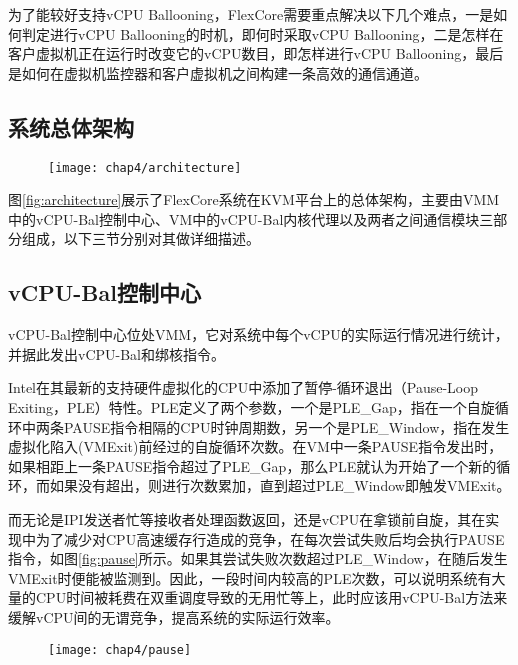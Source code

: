 为了能较好支持vCPU Ballooning，FlexCore需要重点解决以下几个难点，一是如何判定进行vCPU Ballooning的时机，即何时采取vCPU Ballooning，二是怎样在客户虚拟机正在运行时改变它的vCPU数目，即怎样进行vCPU Ballooning，最后是如何在虚拟机监控器和客户虚拟机之间构建一条高效的通信通道。

\subsection{系统总体架构}

\begin{figure}[!htbp]
  \centering
  \texttt{[image: chap4/architecture]}
\end{figure}

图\ref{fig:architecture}展示了FlexCore系统在KVM平台上的总体架构，主要由VMM中的vCPU-Bal控制中心、VM中的vCPU-Bal内核代理以及两者之间通信模块三部分组成，以下三节分别对其做详细描述。

\subsection{vCPU-Bal控制中心}

vCPU-Bal控制中心位处VMM，它对系统中每个vCPU的实际运行情况进行统计，并据此发出vCPU-Bal和绑核指令。

Intel在其最新的支持硬件虚拟化的CPU中添加了暂停-循环退出（Pause-Loop Exiting，PLE）特性\cite{guide2010intel}。PLE定义了两个参数，一个是PLE\_Gap，指在一个自旋循环中两条PAUSE指令相隔的CPU时钟周期数，另一个是PLE\_Window，指在发生虚拟化陷入(VMExit)前经过的自旋循环次数。在VM中一条PAUSE指令发出时，如果相距上一条PAUSE指令超过了PLE\_Gap，那么PLE就认为开始了一个新的循环，而如果没有超出，则进行次数累加，直到超过PLE\_Window即触发VMExit。

而无论是IPI发送者忙等接收者处理函数返回，还是vCPU在拿锁前自旋，其在实现中为了减少对CPU高速缓存行造成的竞争，在每次尝试失败后均会执行PAUSE指令，如图\ref{fig:pause}所示。如果其尝试失败次数超过PLE\_Window，在随后发生VMExit时便能被监测到。因此，一段时间内较高的PLE次数，可以说明系统有大量的CPU时间被耗费在双重调度导致的无用忙等上，此时应该用vCPU-Bal方法来缓解vCPU间的无谓竞争，提高系统的实际运行效率。

\begin{figure}[!htbp]
  \centering
  \texttt{[image: chap4/pause]}
\end{figure}

